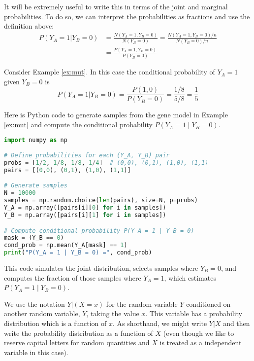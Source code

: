  
 It will be extremely useful to write this in terms of the joint and marginal probabilities. To do so, we can interpret the probabilities as fractions and use the definition above:  
\begin{align*}
P(Y_A=1|Y_B=0) &= \frac{N(Y_A = 1,Y_B= 0)}{N(Y_B=0)} = \frac{N(Y_A = 1,Y_B = 0)/n}{N(Y_B=0)/n} \\
&= \frac{P(Y_A = 1,Y_B = 0)}{P(Y_B = 0)}
\end{align*}


\begin{example}
Consider Example \ref{ex:mut}. In this case the conditional probability of $Y_A = 1$ given $Y_B=0$ is 
\begin{equation*}
P(Y_A = 1|Y_B = 0) = \frac{P(1,0)}{P(Y_B = 0)} = \frac{1/8}{5/8} = \frac{1}{5} 
\end{equation*}

\end{example}


\begin{example}
Here is Python code to generate samples from the gene model in Example \ref{ex:mut} and compute the conditional probability $P(Y_A = 1 \mid Y_B = 0)$.

\begin{lstlisting}[language=Python]
import numpy as np

# Define probabilities for each (Y_A, Y_B) pair
probs = [1/2, 1/8, 1/8, 1/4]  # (0,0), (0,1), (1,0), (1,1)
pairs = [(0,0), (0,1), (1,0), (1,1)]

# Generate samples
N = 10000
samples = np.random.choice(len(pairs), size=N, p=probs)
Y_A = np.array([pairs[i][0] for i in samples])
Y_B = np.array([pairs[i][1] for i in samples])

# Compute conditional probability P(Y_A = 1 | Y_B = 0)
mask = (Y_B == 0)
cond_prob = np.mean(Y_A[mask] == 1)
print("P(Y_A = 1 | Y_B = 0) =", cond_prob)
\end{lstlisting}

This code simulates the joint distribution, selects samples where $Y_B = 0$, and computes the fraction of those samples where $Y_A = 1$, which estimates $P(Y_A = 1 \mid Y_B = 0)$.
\end{example}




We use the notation $Y|(X=x)$ for the random variable $Y$ conditioned on another random variable, $Y$, taking the value $x$. This variable has a probability distribution which is a function of $x$. As shorthand, we might write $Y|X$ and then write the probability distribution as a function of $X$ (even though we like to reserve capital letters for random quantities and $X$ is treated as a independent variable in this case). 

